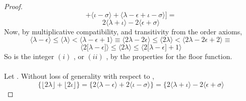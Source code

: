 \documentclass[preview]{standalone}
\begin{document}
\begin{proof}
\begin{equation*}
                +
            \big \langle \iota - \sigma \big \rangle
                +
            \big \langle \lambda - \epsilon + \iota - \sigma \big \rangle
        \Big]
            =
    \end{equation*}
    \begin{equation*}
        2 \big \langle \lambda + \iota \big \rangle 
            -
        2 \big \langle \epsilon + \sigma \big \rangle
    \end{equation*}
    Now, by multiplicative compatibility, 
    and transitivity from the order axioms,
    \begin{equation*}
        \Big \langle \lambda - \epsilon \Big \rangle
            \leq 
        \Big \langle \lambda \Big \rangle
            < 
        \Big \langle \lambda - \epsilon + 1 \Big \rangle
            \equiv
        \Big \langle 2 \lambda - 2\epsilon \Big \rangle
            \leq 
        \Big \langle 2 \lambda \Big \rangle
            < 
        \Big \langle 2 \lambda - 2\epsilon + 2 \Big \rangle
            \equiv
    \end{equation*}
    \begin{equation*}
        \Big \langle 2 \big[ \lambda - \epsilon \big] \Big \rangle
            \leq
        \Big \langle 2 \lambda \Big \rangle
            \leq
        \Big \langle 2 \big[ \lambda - \epsilon \big] + 1 \Big \rangle
    \end{equation*}
    So \bm{$
        \big \lfloor 2 \lambda \big \rfloor
    $}
    is the integer
    $(i)$ \bm{$
        2 \big \langle \lambda - \epsilon \big \rangle
    $}, 
    or $(ii)$ , by the properties for the floor function.
    \\ \\
     Let \bm{$
        \big \lfloor 2 \lambda \big \rfloor 
            = 
        2 \big \langle \lambda - \epsilon \big \rangle
    $}. 
    Without loss of generality with respect to \bm{$\iota$},
    \begin{equation*}
        \Big \{ 
            \big \lfloor 2 \lambda \big \rfloor 
                + 
            \big \lfloor 2 \iota \big \rfloor
        \Big \}
            =
        \Big \{
            2 \big \langle \lambda - \epsilon \big \rangle 
                + 
            2 \big \langle \iota - \sigma \big \rangle
        \Big \}
            =
        \Big \{
            2 \big \langle \lambda + \iota \big \rangle
                - 
            2 \big \langle \epsilon + \sigma \big \rangle

\end{equation*}
\end{proof}
\end{document}
